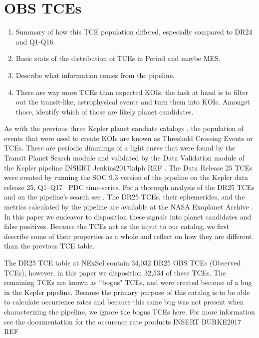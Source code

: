 \section{OBS TCEs}

\begin{enumerate}
\item Summary of how this TCE population differed, especially compared to DR24 and Q1-Q16.
\item Basic stats of the distribution of TCEs in Period and maybe MES.
\item Describe what information comes from the pipeline.
\item There are way more TCEs than expected KOIs, the task at hand is to filter out the transit-like, astrophysical events and turn them into KOIs. Amongst those, identify which of those are likely planet candidates.  

\end{enumerate}

\label{tces}
As with the previous three Kepler planet candiate catalogs \citep{Coughlin2016,Mullally2015cat,Rowe2015cat}, the population of events that were used to create KOIs are known as Threshold Crossing Events or TCEs.  These are periodic dimmings of a light curve that were found by the  Transit Planet Search module and validated by the Data Validation module of the Kepler pipeline INSERT Jenkins2017kdph REF \citep{Fanelli2011}.   The Data Release 25 TCEs were created by running the SOC 9.3 version of the pipeline on the Kepler data release 25, Q1--Q17 \Kepler\ PDC time-series.  For a thorough analysis of the DR25 TCEs and on the pipeline's search see \citet{Twicken2016}.  The DR25 TCEs, their ephemerides, and the metrics calculated by the pipeline are available at the NASA Exoplanet Archive \citet{Akeson2013}.  In this paper we endeavor to disposition these signals into planet candidates and false positives.   Because the TCEs act as the input to our catalog, we first describe some of their properties as a whole and reflect on how they are different than the previous TCE table.

The DR25 TCE table at NExScI contain 34,032 DR25 OBS TCEs (Observed TCEs), however, in this paper we disposition 32,534 of these TCEs. The remaining TCEs are known as ``bogus" TCEs, and were created because of a bug in the Kepler pipeline. Because the primary purpose of this catalog is to be able to calculate occurrence rates and because this same bug was not present when characterizing the pipeline, we ignore the bogus TCEs here. For more information see the documentation for the occurence rate products INSERT BURKE2017 REF%

